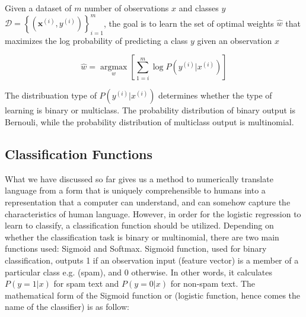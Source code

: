 
Given a dataset of $m$ number of observations $x$ and classes $y$ $\mathcal { D } = \left\{ \left( \boldsymbol { x } ^ { ( i ) } , y ^ { ( i ) } \right) \right\} _ { i = 1 } ^ { m }$, the goal is to learn the set of optimal weights $\hat{w}$ that maximizes the log probability of predicting a class $y$ given an observation $x$

\begin{equation}
\hat{w}=\underset{w}{\operatorname{argmax}}\left[\sum_{1=i}^{m} \log P\left(y^{(i)} | x^{(i)}\right)\right]
\end{equation}

The distribuation type of $P\left(y^{(i)} | x^{(i)}\right)$ determines whether the type of learning is binary or multiclass. The probability distribution of binary output is Bernouli, while the probability distribution of multiclass output is multinomial. 

\subsection{Classification Functions}
What we have discussed so far gives us a method to numerically translate language from a form that is uniquely comprehensible to humans into a representation that a computer can understand, and can somehow capture the characteristics of human language. However, in order for the logistic regression to learn to classify, a classification function should be utilized. Depending on whether the classification task is binary or multinomial, there are two main functions used: Sigmoid and Softmax. Sigmoid function, used for binary classification, outputs 1 if an observation input (feature vector) is a member of a particular class e.g. (spam), and 0 otherwise. In other words, it calculates $P(y=1|x)$ for spam text and $P(y=0|x)$ for non-spam text. The mathematical form of the Sigmoid function or (logistic function, hence comes the name of the classifier) is as follow:

